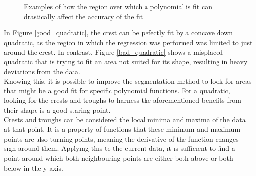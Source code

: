 \documentclass[12pt, a4paper]{article}
\begin{document}
\begin{figure}[H]
    \centering
    \caption{ Examples of how the region over which a polynomial is fit can
    drastically affect the accuracy of the fit }
    \label{bad_good_quadratics}
\end{figure}

In Figure \ref{good_quadratic}, the crest can be pefectly fit by a concave down
quadratic, as the region in which the regression was performed was limited to
just around the crest. In contrast, Figure \ref{bad_quadratic} shows a misplaced
quadratic that is trying to fit an area not suited for its shape, resulting in
heavy deviations from the data. \\

Knowing this, it is possible to improve the segmentation method to look for
areas that might be a good fit for specific polynomial functions. For a
quadratic, looking for the crests and troughs to harness the aforementioned
benefits from their shape is a good staring point. \\ 

Crests and troughs can be considered the local minima and maxima of the data at
that point. It is a property of functions that these minimum and maximum points
are also turning points, meaning the derivative of the function changes sign
around them. Applying this to the current data, it is sufficient to find a point
around which both neighbouring points are either both above or both below in the
y-axis.
\end{document}
